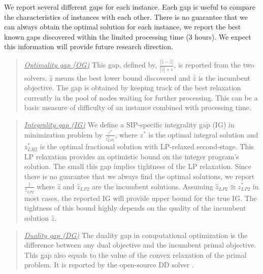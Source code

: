 We report several different gaps for each instance. Each gap is useful to compare the characteristics of instances with each other. There is no guarantee that we can always obtain the optimal solution for each instance, we report the best known gaps discovered within the limited processing time (3 hours). We expect this information will provide future research direction. 


\begin{quote}
\noindent\underline{\textit{Optimality gap (OG)}} This gap, defined by, $\frac{|\underline{\hat{z}}-\hat{z}|}{|\hat{z}|+\epsilon}$, is reported from the two solvers. $\underline{\hat{z}}$ means the best lower bound discovered and $\hat{z}$ is the incumbent objective. The gap is obtained by keeping track of the best relaxation currently in the pool of nodes waiting for further processing. This can be a basic measure of difficulty of an instance combined with processing time.
\end{quote}

\begin{quote}
\noindent\underline{\textit{Integrality gap (IG)}} We define a SIP-specific integrality gap (IG) in minimization problem by $\frac{z^*}{z^*_{LP2}}$, where $z^*$ is the optimal integral solution and $z^*_{LR2}$ is the optimal fractional solution with LP-relaxed second-stage. This LP relaxation provides an optimistic bound on the integer program's solution. The small this gap implies tightness of the LP relaxation. Since there is no guarantee that we always find the optimal solutions, we report $\frac{\hat{z}}{\hat{z}_{LP2}}$ where $\hat{z}$ and $\hat{z}_{LP2}$ are the incumbent solutions. Assuming $\hat{z}_{LP2}\approxeq z^*_{LP2}$ in most cases, the reported IG will provide upper bound for the true IG. The tightness of this bound highly depends on the quality of the incumbent solution $\hat{z}$.%
\end{quote}

\begin{quote}
\noindent\underline{\textit{Duality gap (DG)}} The duality gap in computational optimization is the difference between any dual objective and the incumbent primal objective. This gap also equals to the value of the convex relaxation of the primal problem. It is reported by the open-source DD solver \dsp.
\end{quote}

